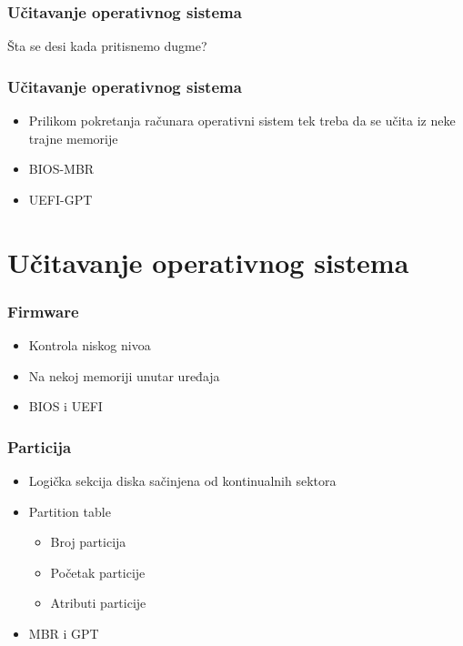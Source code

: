 \documentclass{beamer}
\begin{document}
\begin{frame}
    \frametitle{Učitavanje operativnog sistema}
    \begin{center}
        \large{Šta se desi kada pritisnemo dugme?}
    \end{center}
\end{frame}

\begin{frame}
    \frametitle{Učitavanje operativnog sistema}
    \begin{itemize}
        \item Prilikom pokretanja računara operativni sistem tek treba da se učita iz neke trajne memorije \newline
        \item BIOS-MBR \newline
        \item UEFI-GPT
    \end{itemize}
\end{frame}

\section*{Učitavanje operativnog sistema}
\begin{frame}
    \frametitle{Firmware}
    \begin{itemize}
        \item Kontrola niskog nivoa \newline
        \item Na nekoj memoriji unutar uređaja \newline
        \item BIOS i UEFI
    \end{itemize}
\end{frame}

\begin{frame}
    \frametitle{Particija}
    \begin{itemize}
        \item Logička sekcija diska sačinjena od kontinualnih sektora \newline
        \item Partition table \begin{itemize}
            \item Broj particija \newline
            \item Početak particije \newline
            \item Atributi particije \newline
        \end{itemize}
        \item MBR i GPT
    \end{itemize}
\end{frame}
\end{document}

